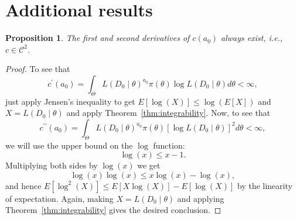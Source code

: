 \documentclass[a4paper, notitlepage, 11pt]{article}
\newtheorem{proposition}{Proposition}[]
\begin{document}


\appendix

\section{Additional results}
\label{sec:further_proofs}

\begin{proposition}
\label{prop:c_is_C2}
The first and second derivatives of $c(a_0)$ always exist, i.e., $c \in \mathcal{C}^2$. 
\end{proposition}
\begin{proof}
To see that
\[c^\prime(a_0) = \int_{\Theta} L(D_0\mid\theta)^{a_0} \pi(\theta) \log L(D_0\mid\theta) d\theta < \infty, \]
just apply Jensen's inequality to get $E[\log(X)] \leq \log\left(E[X]\right)$ and $ X = L( D_0 \mid \theta)$ and apply Theorem~\ref{thm:integrability}.
Now, to see that 
\[ c^{\prime\prime}(a_0) = \int_{\Theta} L(D_0\mid\theta)^{a_0} \pi(\theta) [\log L(D_0\mid\theta)]^2 d\theta < \infty, \]
we will use the upper bound on the $\log$ function:
\[ \log(x) \leq x - 1.\]
Multiplying both sides by $\log(x)$ we get
\[ \log(x)\log(x) \leq x\log(x) - \log(x),\]
and hence $E[\log^2(X)] \leq E[X\log(X)] - E[\log(X)]$ by the linearity of expectation.
Again, making $X = L(D_0 \mid \theta)$ and applying Theorem~\ref{thm:integrability} gives the desired conclusion.
\end{proof}
\end{document}
